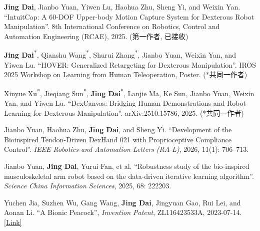 \vspace{-2mm}
\vspace{-1.5mm}

\begin{cvitemize2}
    \item \textbf{Jing Dai}, Jianbo Yuan, Yiwen Lu, Haohua Zhu, Sheng Yi, and Weixin Yan. ``IntuitCap: A 60-DOF Upper-body Motion Capture System for Dexterous Robot Manipulation''. 8th International Conference on Robotics, Control and Automation Engineering (RCAE), 2025. (第一作者, 已接收)
    \item \textbf{Jing Dai}\textsuperscript{*}, Qianshu Wang\textsuperscript{*}, Shurui Zhang\textsuperscript{*}, Jianbo Yuan, Weixin Yan, and Yiwen Lu. ``HOVER: Generalized Retargeting for Dexterous Manipulation''. IROS 2025 Workshop on Learning from Human Teleoperation, Poster. (*共同一作者)
    \item Xinyue Xu\textsuperscript{*}, Jieqiang Sun\textsuperscript{*}, \textbf{Jing Dai}\textsuperscript{*}, Lanjie Ma, Ke Sun, Jianbo Yuan, Weixin Yan, and Yiwen Lu. ``DexCanvas: Bridging Human Demonstrations and Robot Learning for Dexterous Manipulation''. arXiv:2510.15786, 2025. (*共同一作者)
    \item Jianbo Yuan, Haohua Zhu, \textbf{Jing Dai}, and Sheng Yi. ``Development of the Bioinspired Tendon-Driven DexHand 021 with Proprioceptive Compliance Control''. \textit{IEEE Robotics and Automation Letters (RA-L)}, 2026, 11(1): 706--713.
    \item Jianbo Yuan, \textbf{Jing Dai}, Yurui Fan, et al. ``Robustness study of the bio-inspired musculoskeletal arm robot based on the data-driven iterative learning algorithm''. \textit{Science China Information Sciences}, 2025, 68: 222203.
    \item Yuchen Jia, Suzhen Wu, Gang Wang, \textbf{Jing Dai}, Jingyuan Gao, Rui Lei, and Aonan Li. ``A Bionic Peacock'', \textit{Invention Patent}, ZL116423533A, 2023-07-14. \href{https://pss-system.cponline.cnipa.gov.cn/documents/detail?prevPageTit=changgui}{\textcolor{link}{[Link]}}
\end{cvitemize2}
